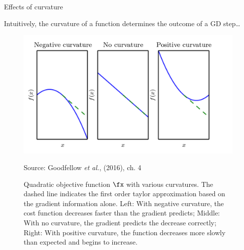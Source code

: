 \begin{frame} {Effects of curvature}

Intuitively, the curvature of a function determines the outcome of a GD step\dots


\vspace*{-0.5cm}
\begin{figure}
\captionsetup{font=footnotesize,labelfont=footnotesize, labelfont = bf}
\begin{center}
	\includegraphics[width=.7\textwidth]{plots/curvature.png}
\end{center}
\tiny{Source: Goodfellow \emph{et al.}, (2016), ch. 4}
\caption{Quadratic objective function $\fx$ with various curvatures.
The dashed line indicates the first order taylor approximation based on the gradient information alone. Left: With negative curvature, the cost function decreases faster than the gradient predicts; Middle: With no curvature, the gradient predicts the decrease correctly; Right: With positive curvature, the function decreases more slowly than expected and begins to increase. }
\end{figure}
\end{frame}

